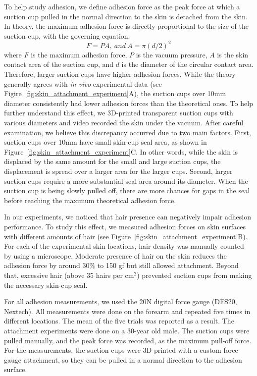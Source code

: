 To help study adhesion, we define adhesion force as the peak force at which a suction cup pulled in the normal direction to the skin is detached from the skin. In theory, the maximum adhesion force is directly proportional to the size of the suction cup, with the governing equation: \[F=PA,~and~ A=  \pi(d/2)^2\] where $F$ is the maximum adhesion force, $P$ is the vacuum pressure, $A$ is the skin contact area of the suction cup, and $d$ is the diameter of the circular contact area. Therefore, larger suction cups have higher adhesion forces. While the theory generally agrees with \textit{in vivo} experimental data (see Figire~\ref{fig:skin_attachment_experiment}A), the suction cups over 10mm diameter consistently had lower adhesion forces than the theoretical ones. To help further understand this effect, we 3D-printed transparent suction cups with various diameters and video recorded the skin under the vacuum. After careful examination, we believe this discrepancy occurred due to two main factors. First, suction cups over 10mm have small skin-cup seal area, as shown in Figure~\ref{fig:skin_attachment_experiment}C. In other words, while the skin is displaced by the same amount for the small and large suction cups, the displacement is spread over a larger area for the larger cups. Second, larger suction cups require a more substantial seal area around its diameter. When the suction cup is being slowly pulled off, there are more chances for gaps in the seal before reaching the maximum theoretical adhesion force.  

In our experiments, we noticed that hair presence can negatively impair adhesion performance. To study this effect, we measured adhesion forces on skin surfaces with different amounts of hair (see Figure~\ref{fig:skin_attachment_experiment}B). For each of the experimental skin locations, hair density was manually counted by using a microscope. Moderate presence of hair on the skin reduces the adhesion force by around 30\% to 150 gf but still allowed attachment. Beyond that, excessive hair (above 35 hairs per cm$^2$) prevented suction cups from making the necessary skin-cup seal.

For all adhesion measurements, we used the 20N digital force gauge (DFS20, Nextech). All measurements were done on the forearm and repeated five times in different locations. The mean of the five trials was reported as a result. The attachment experiments were done on a 30-year old male. The suction cups were pulled manually, and the peak force was recorded, as the maximum pull-off force. For the measurements, the suction cups were 3D-printed with a custom force gauge attachment, so they can be pulled in a normal direction to the adhesion surface.

